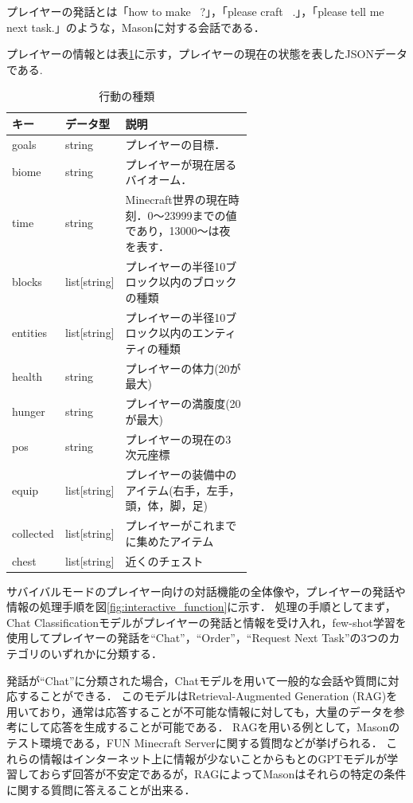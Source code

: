 プレイヤーの発話とは「how to make ~?」，「please craft ~.」，「please tell me next task.」のような，Masonに対する会話である．

プレイヤーの情報とは表\ref{tab:player_data}に示す，プレイヤーの現在の状態を表したJSONデータである.
\begin{table}[H]
    \caption{行動の種類}\label{tab:player_data}
    \centering
    \begin{tabular}{llp{0.6\linewidth}}
        \hline \hline
        キー & データ型 & 説明 \\
        \hline
        goals & string & プレイヤーの目標． \\
        biome & string & プレイヤーが現在居るバイオーム． \\
        time & string & Minecraft世界の現在時刻．0～23999までの値であり，13000～は夜を表す． \\
        blocks & list[string] & プレイヤーの半径10ブロック以内のブロックの種類 \\
        entities & list[string] & プレイヤーの半径10ブロック以内のエンティティの種類 \\
        health & string & プレイヤーの体力(20が最大) \\
        hunger & string & プレイヤーの満腹度(20が最大) \\
        pos & string & プレイヤーの現在の3次元座標 \\
        equip & list[string] & プレイヤーの装備中のアイテム(右手，左手，頭，体，脚，足) \\
        collected & list[string] & プレイヤーがこれまでに集めたアイテム \\
        chest & list[string] & 近くのチェスト \\
        \hline
    \end{tabular}
\end{table}

サバイバルモードのプレイヤー向けの対話機能の全体像や，プレイヤーの発話や情報の処理手順を図\ref{fig:interactive_function}に示す．
処理の手順としてまず，Chat Classificationモデルがプレイヤーの発話と情報を受け入れ，few-shot学習を使用してプレイヤーの発話を``Chat''，``Order''，``Request Next Task''の3つのカテゴリのいずれかに分類する．

発話が``Chat''に分類された場合，Chatモデルを用いて一般的な会話や質問に対応することができる．
このモデルはRetrieval-Augmented Generation (RAG)\cite{}を用いており，通常は応答することが不可能な情報に対しても，大量のデータを参考にして応答を生成することが可能である．
RAGを用いる例として，Masonのテスト環境である，FUN Minecraft Server\cite{}に関する質問などが挙げられる．
これらの情報はインターネット上に情報が少ないことからもとのGPTモデルが学習しておらず回答が不安定であるが，RAGによってMasonはそれらの特定の条件に関する質問に答えることが出来る．

